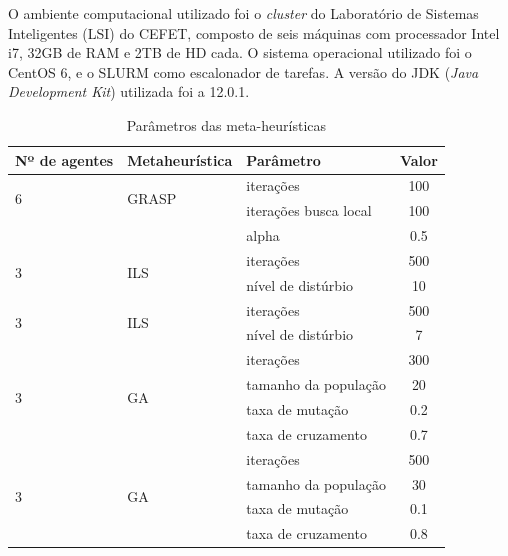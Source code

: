 O ambiente computacional utilizado foi o \textit{cluster} do Laboratório de Sistemas Inteligentes (LSI) do CEFET, composto de seis máquinas com processador Intel i7, 32GB de RAM e 2TB de HD cada. O sistema operacional utilizado foi o CentOS 6, e o SLURM como escalonador
de tarefas. A versão do JDK (\textit{Java Development Kit}) utilizada foi a 12.0.1.

\begin{table}
\caption{\label{tab:expS}Parâmetros das meta-heurísticas}
\centering

\begin{tabular}{lllc}
    \toprule
    \textbf{Nº de agentes}  & \textbf{Metaheurística}   & \textbf{Parâmetro}        & \textbf{Valor} \\
    \midrule
    \multirow{2}{*}{6}      & \multirow{2}{*}{GRASP}    & iterações                 & 100\\
                            &                           & iterações busca local     & 100\\
                            &                           & alpha                     & 0.5\\
    \midrule
    \multirow{2}{*}{3}      & \multirow{2}{*}{ILS}      & iterações                 & 500\\
                            &                           & nível de distúrbio        & 10\\
    \midrule
    \multirow{2}{*}{3}      & \multirow{2}{*}{ILS}      & iterações                 & 500\\
                            &                           & nível de distúrbio        & 7\\
    \midrule
    \multirow{4}{*}{3}      & \multirow{4}{*}{GA}       & iterações                 & 300\\
                            &                           & tamanho da população      & 20\\
                            &                           & taxa de mutação           & 0.2\\
                            &                           & taxa de cruzamento        & 0.7\\
    \midrule
    \multirow{4}{*}{3}      & \multirow{4}{*}{GA}       & iterações                 & 500\\
                            &                           & tamanho da população      & 30\\
                            &                           & taxa de mutação           & 0.1\\
                            &                           & taxa de cruzamento        & 0.8\\
    \bottomrule
\end{tabular}
\end{table}


